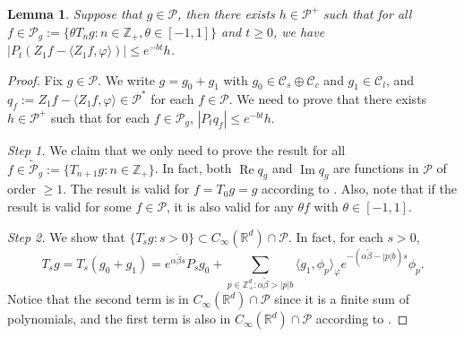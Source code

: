 \documentclass[12pt,a4paper]{amsart}
\theoremstyle{plain}
\newtheorem{lem}[thm]{Lemma}
\theoremstyle{definition}
\numberwithin{equation}{section}
\begin{document}
\begin{lem}
  \label{lem:P:R}
  Suppose that $g \in \mathcal P$, then there exists $h \in \mathcal P^+$ such that for all $ f \in \mathcal P_g := \{\theta T_n g: n \in \mathbb Z_+, \theta \in [-1,1]\} $ and $t\geq 0$, we have $ | P_t (Z_1 f - \langle Z_1 f, \varphi \rangle )| \leq e^{-bt} h$.
\end{lem}
\begin{proof}
Fix $g \in \mathcal P$.
We write  $g = g_0 + g_1$ with $g_0 \in \mathcal C_s \oplus \mathcal C_c$ and $g_1 \in \mathcal C_l$,  and $q_f:=Z_1f - \langle Z_1f, \varphi \rangle\in \mathcal P^*$ for each $f\in \mathcal P$.
  We need to prove that there exists $h \in \mathcal P^+$ such that for each $f\in \mathcal P_g$, $|P_tq_f| \leq e^{-bt} h$.

  \emph{Step 1.} We claim  that we only need to prove the result for all
  $f \in \widetilde{\mathcal P}_g:= \{T_{n+1} g : n \in \mathbb Z_+\}$.
  In fact, both $\operatorname{Re} q_g$ and $\operatorname{Im} q_g$ are functions in $\mathcal P$ of order $\geq 1$.
  The result is valid for $f = T_0 g = g$ according to \cite[Fact 1.2]{MarksMilos2018CLT}.
  Also, note that if the result is valid for some $f \in \mathcal P$, it is also valid for any $\theta f$ with $\theta \in [-1,1]$.


  \emph{Step 2.} We show that $\{T_s g: s> 0\} \subset C_\infty (\mathbb R^d) \cap \mathcal P$.
  In fact, for each $s > 0$,
  \[
    T_s g
    = T_s (g_0 + g_1)
    = e^{\alpha \tilde \beta s}P_s g_0 + \sum_{p \in \mathbb Z_+^d: \alpha \tilde \beta > |p|b} 
    \langle g_1, \phi_p \rangle_\varphi e^{-(\alpha \tilde \beta - |p|b)s} \phi_p.
  \]
  Notice that the second term is in $C_\infty(\mathbb R^d)\cap \mathcal P$ since it is a finite sum of polynomials, and the first term is also in $C_\infty (\mathbb R^d) \cap \mathcal P$ according to \cite[Fact 1.1]{MarksMilos2018CLT}.


\end{proof}
\end{document}
